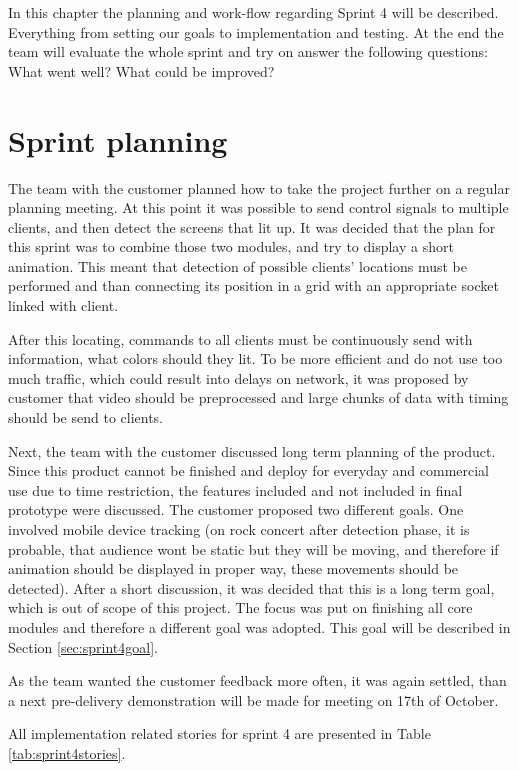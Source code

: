 \label{chap:sprint4}
In this chapter the planning and work-flow regarding Sprint 4 will be described. 
Everything from setting our goals to implementation and testing. At the end the team will evaluate the whole sprint and try on answer the following questions: What went well? What could be improved? 
\section{Sprint planning}

The team with the customer planned how to take the project further on a regular planning meeting.
At this point it was possible to send control signals to multiple clients, and then detect the screens that lit up. 
It was decided that the plan for this sprint was to combine those two modules, and try to display a short animation.
This meant that detection of possible clients' locations must be performed and than connecting its position in a grid with an appropriate socket linked with client.

After this locating, commands to all clients must be continuously send with information, what colors should they lit.
To be more efficient and do not use too much traffic, which could result into delays on network, it was proposed by customer that video should be preprocessed and large chunks of data with timing should be send to clients.

Next, the team with the customer discussed long term planning of the product.
Since this product cannot be finished and deploy for everyday and commercial use due to time restriction, the features included and not included in final prototype were discussed.
The customer proposed two different goals.
One involved mobile device tracking (on rock concert after detection phase, it is probable, that audience wont be static but they will be moving, and therefore if animation should be displayed in proper way, these movements should be detected).
After a short discussion, it was decided that this is a long term goal, which is out of scope of this project.
The focus was put on finishing all core modules and therefore a different goal was adopted.
This goal will be described in Section \ref{sec:sprint4goal}.

As the team wanted the customer feedback more often, it was again settled, than a next pre-delivery demonstration will be made for meeting on 17th of October. 

All implementation related stories for sprint 4 are presented in Table \ref{tab:sprint4stories}.



